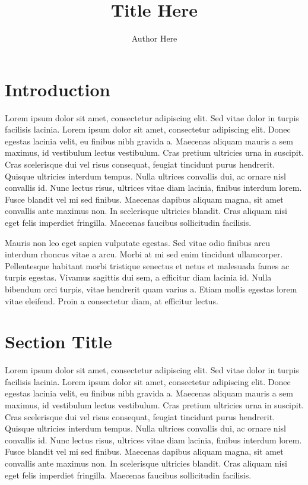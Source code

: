 \documentclass[12pt]{amsart}
\title{Title Here}
\author{Author Here}
\theoremstyle{definition}
\theoremstyle{remark}
\begin{document}
\maketitle


\section*{Introduction}

 Lorem ipsum dolor sit amet, consectetur adipiscing elit. Sed vitae dolor in turpis facilisis lacinia. Lorem ipsum dolor sit amet, consectetur adipiscing elit. Donec egestas lacinia velit, eu finibus nibh gravida a. Maecenas aliquam mauris a sem maximus, id vestibulum lectus vestibulum. Cras pretium ultricies urna in suscipit. Cras scelerisque dui vel risus consequat, feugiat tincidunt purus hendrerit. Quisque ultricies interdum tempus. Nulla ultrices convallis dui, ac ornare nisl convallis id. Nunc lectus risus, ultrices vitae diam lacinia, finibus interdum lorem. Fusce blandit vel mi sed finibus. Maecenas dapibus aliquam magna, sit amet convallis ante maximus non. In scelerisque ultricies blandit. Cras aliquam nisi eget felis imperdiet fringilla. Maecenas faucibus sollicitudin facilisis.

Mauris non leo eget sapien vulputate egestas. Sed vitae odio finibus arcu interdum rhoncus vitae a arcu. Morbi at mi sed enim tincidunt ullamcorper. Pellentesque habitant morbi tristique senectus et netus et malesuada fames ac turpis egestas. Vivamus sagittis dui sem, a efficitur diam lacinia id. Nulla bibendum orci turpis, vitae hendrerit quam varius a. Etiam mollis egestas lorem vitae eleifend. Proin a consectetur diam, at efficitur lectus. 

\section{Section Title}

 Lorem ipsum dolor sit amet, consectetur adipiscing elit. Sed vitae dolor in turpis facilisis lacinia. Lorem ipsum dolor sit amet, consectetur adipiscing elit. Donec egestas lacinia velit, eu finibus nibh gravida a. Maecenas aliquam mauris a sem maximus, id vestibulum lectus vestibulum. Cras pretium ultricies urna in suscipit. Cras scelerisque dui vel risus consequat, feugiat tincidunt purus hendrerit. Quisque ultricies interdum tempus. Nulla ultrices convallis dui, ac ornare nisl convallis id. Nunc lectus risus, ultrices vitae diam lacinia, finibus interdum lorem. Fusce blandit vel mi sed finibus. Maecenas dapibus aliquam magna, sit amet convallis ante maximus non. In scelerisque ultricies blandit. Cras aliquam nisi eget felis imperdiet fringilla. Maecenas faucibus sollicitudin facilisis.
\end{document}
